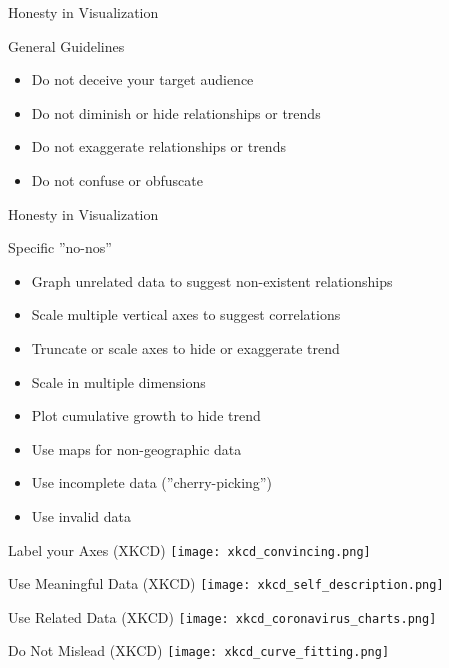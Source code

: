 \documentclass[ignorenonframetext,xcolor=x11names]{beamer}
\begin{document}
\begin{frame}{Honesty in Visualization}
\begin{block}{General Guidelines}
	\begin{itemize}
		\item Do not deceive your target audience
		\item Do not diminish or hide relationships or trends
		\item Do not exaggerate relationships or trends
		\item Do not confuse or obfuscate
	\end{itemize}
\end{block}
\end{frame}

\begin{frame}{Honesty in Visualization}
\begin{block}{Specific ''no-nos''}
	\begin{itemize}
		\item Graph unrelated data to suggest non-existent relationships
		\item Scale multiple vertical axes to suggest correlations
		\item Truncate or scale axes to hide or exaggerate trend
		\item Scale in multiple dimensions
		\item Plot cumulative growth to hide trend
		\item Use maps for non-geographic data
		\item Use incomplete data (''cherry-picking'')
		\item Use invalid data
	\end{itemize}	
\end{block}
\end{frame}

\begin{frame}{Label your Axes (XKCD)}
  \texttt{[image: xkcd\_convincing.png]}
\end{frame}

\begin{frame}{Use Meaningful Data (XKCD)}
  \texttt{[image: xkcd\_self\_description.png]}
\end{frame}

\begin{frame}{Use Related Data (XKCD)}
  \texttt{[image: xkcd\_coronavirus\_charts.png]}
\end{frame}

\begin{frame}{Do Not Mislead (XKCD)}
\centering
  \texttt{[image: xkcd\_curve\_fitting.png]}
\end{frame}
\end{document}
